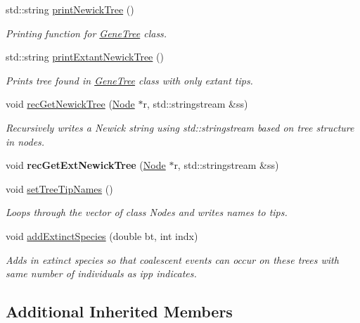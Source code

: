 \begin{DoxyCompactItemize}
std\+::string \mbox{\hyperlink{class_gene_tree_a5c9b307d48f39ed63b1a300153e808e1}{print\+Newick\+Tree}} ()
\begin{DoxyCompactList}\small\item\em Printing function for \mbox{\hyperlink{class_gene_tree}{Gene\+Tree}} class. \end{DoxyCompactList}\item 
std\+::string \mbox{\hyperlink{class_gene_tree_a877e150b8f85aded8a8a80bf466e6038}{print\+Extant\+Newick\+Tree}} ()
\begin{DoxyCompactList}\small\item\em Prints tree found in \mbox{\hyperlink{class_gene_tree}{Gene\+Tree}} class with only extant tips. \end{DoxyCompactList}\item 
void \mbox{\hyperlink{class_gene_tree_a47d25bac2bc3d18e96a1b9c970bf6dc2}{rec\+Get\+Newick\+Tree}} (\mbox{\hyperlink{class_node}{Node}} $\ast$r, std\+::stringstream \&ss)
\begin{DoxyCompactList}\small\item\em Recursively writes a Newick string using std\+::stringstream based on tree structure in nodes. \end{DoxyCompactList}\item 
\mbox{\label{class_gene_tree_a0ab9bf53a7821e1c8fbb209aa56be876}} 
void {\bfseries rec\+Get\+Ext\+Newick\+Tree} (\mbox{\hyperlink{class_node}{Node}} $\ast$r, std\+::stringstream \&ss)
\item 
void \mbox{\hyperlink{class_gene_tree_a7c67f2aa78bd6d46e6f1b2fede6c3284}{set\+Tree\+Tip\+Names}} ()
\begin{DoxyCompactList}\small\item\em Loops through the vector of class Nodes and writes names to tips. \end{DoxyCompactList}\item 
void \mbox{\hyperlink{class_gene_tree_ad79daade253cb04d531122307ca64367}{add\+Extinct\+Species}} (double bt, int indx)
\begin{DoxyCompactList}\small\item\em Adds in extinct species so that coalescent events can occur on these trees with same number of individuals as ipp indicates. \end{DoxyCompactList}\end{DoxyCompactItemize}
\subsection*{Additional Inherited Members}


